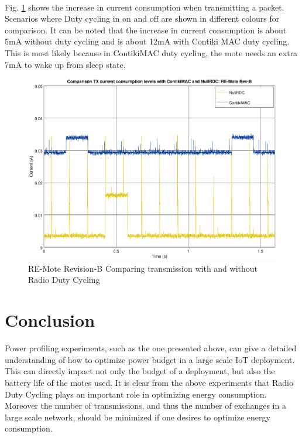 \documentclass[a4paper]{article}
\begin{document}
\paragraph{}
Fig. \ref{fig:revb-tx} shows the increase in current consumption when transmitting a packet. Scenarios where Duty cycling in on and off are shown in different colours for comparison. It can be noted that the increase in current consumption is about 5mA without duty cycling and is about 12mA with Contiki MAC duty cycling. This is most likely because in ContikiMAC duty cycling, the mote needs an extra 7mA to wake up from sleep state.
\begin{figure}[H]
  \centering
  \includegraphics[width=1.0\textwidth]{plots/tx_comparison_revb.eps}
  \caption{\label{fig:revb-tx}RE-Mote Revision-B Comparing transmission with and without Radio Duty Cycling}
\end{figure}

\section{Conclusion}
Power profiling experiments, such as the one presented above, can give a detailed understanding of how to optimize power budget in a large scale IoT deployment. This can directly impact not only the budget of a deployment, but also the battery life of the motes used. It is clear from the above experiments that Radio Duty Cycling plays an important role in optimizing energy consumption. Moreover the number of transmissions, and thus the number of exchanges in a large scale network, should be minimized if one desires to optimize energy consumption.
\end{document}

